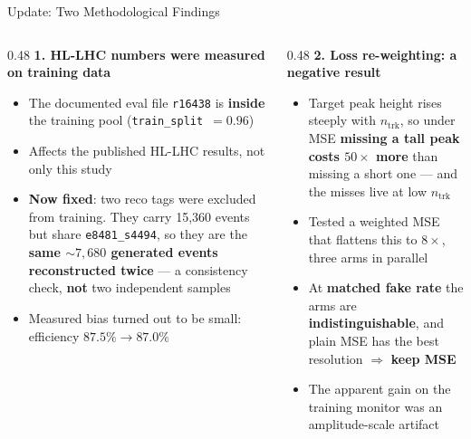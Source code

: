 \documentclass[xcolor=table,aspectratio=169]{beamer}
\newcommand{\ntrk}{\ensuremath{n_\mathrm{trk}}}
\begin{document}
\begin{frame}{Update: Two Methodological Findings}
    \begin{columns}[T]
        \begin{column}{0.48\linewidth}
            \textbf{1. HL-LHC numbers were measured on training data}
            \vspace{0.3em}
            \begin{itemize}\footnotesize\setlength\itemsep{0.25em}
                \item The documented eval file \texttt{r16438} is \textbf{inside}
                      the training pool (\texttt{train\_split}~$=0.96$)
                \item Affects the published HL-LHC results, not only this study
                \item \textbf{Now fixed}: two reco tags were excluded from
                      training. They carry 15{,}360 events but share
                      \texttt{e8481\_s4494}, so they are the \textbf{same
                      ${\sim}7{,}680$ generated events reconstructed twice} --- a
                      consistency check, \textbf{not} two independent samples
                \item Measured bias turned out to be small:
                      efficiency $87.5\%\rightarrow87.0\%$
            \end{itemize}
        \end{column}
        \begin{column}{0.48\linewidth}
            \textbf{2. Loss re-weighting: a negative result}
            \vspace{0.3em}
            \begin{itemize}\footnotesize\setlength\itemsep{0.25em}
                \item Target peak height rises steeply with \ntrk, so under MSE
                      \textbf{missing a tall peak costs $50\times$ more} than
                      missing a short one --- and the misses live at low \ntrk
                \item Tested a weighted MSE that flattens this to $8\times$,
                      three arms in parallel
                \item At \textbf{matched fake rate} the arms are
                      \textbf{indistinguishable}, and plain MSE has the best
                      resolution $\Rightarrow$ \textbf{keep MSE}
                \item The apparent gain on the training monitor was an
                      amplitude-scale artifact
            \end{itemize}
        \end{column}
    \end{columns}
\end{frame}
\end{document}
